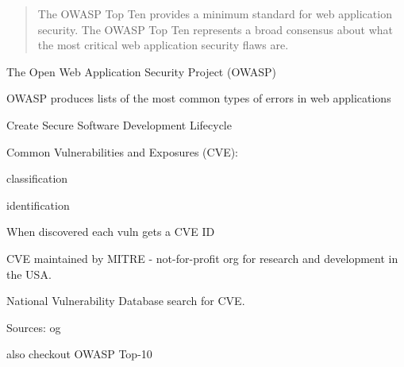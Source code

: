 \documentclass[Screen16to9,17pt]{foils}
\begin{document}


\begin{quote}
The OWASP Top Ten provides a minimum standard for web application
security. The OWASP Top Ten represents a broad consensus about what
the most critical web application security flaws are.
\end{quote}

\begin{list1}
\item The Open Web Application Security Project (OWASP)
\item OWASP produces lists of the most common types of errors in web applications
\item {}
\item Create Secure Software Development Lifecycle
\end{list1}




\begin{list1}
\item Common Vulnerabilities and Exposures (CVE):
  \begin{list2}
  \item classification
  \item identification
  \end{list2}
\item When discovered each vuln gets a CVE ID
\item CVE maintained by MITRE - not-for-profit
org for research and development in the USA.
\item National Vulnerability Database search for CVE.
\item Sources:  og 
\item also checkout OWASP Top-10 
\end{list1}

\end{document}
